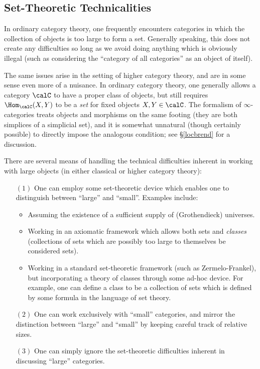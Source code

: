 \subsection{Set-Theoretic Technicalities}

In ordinary category theory, one frequently encounters categories in which the collection of objects
is too large to form a set. Generally speaking, this does not create
any difficulties so long as we avoid doing anything which is obviously illegal
(such as considering the ``category of all categories'' as an object of itself).

The same issues arise in the setting of higher category theory, and are
in some sense even more of a nuisance. In ordinary category
theory, one generally allows a category $\calC$ to have a proper
class of objects, but still requires $\Hom_{\calC}(X,Y)$ to be a
{\em set} for fixed objects $X,Y \in \calC$. The formalism of $\infty$-categories treats
objects and morphisms on the same footing (they are both simplices of a simplicial set), and it is somewhat unnatural (though certainly possible) to directly impose the analogous condition; see \S \ref{locbrend} for a discussion.

There are several means of handling the technical difficulties
inherent in working with large objects (in either classical or higher category theory):

\begin{itemize}
\item[$(1)$] One can employ some set-theoretic device which enables one
to distinguish between ``large'' and ``small''. Examples include:
\begin{itemize}
\item Assuming the existence of a sufficient supply of
(Grothendieck) universes.

\item Working in an axiomatic framework which allows both sets and
{\it classes} (collections of sets which are possibly too large to
themselves be considered sets).

\item Working in a standard set-theoretic framework (such as
Zermelo-Frankel), but incorporating a theory of classes through
some ad-hoc device. For example, one can define a class to be a
collection of sets which is defined by some formula in the
language of set theory.
\end{itemize}

\item[$(2)$] One can work exclusively with ``small'' categories, and
mirror the distinction between ``large'' and ``small'' by keeping
careful track of relative sizes.

 \item[$(3)$] One can simply ignore the set-theoretic difficulties
 inherent in discussing ``large'' categories.

\end{itemize}


